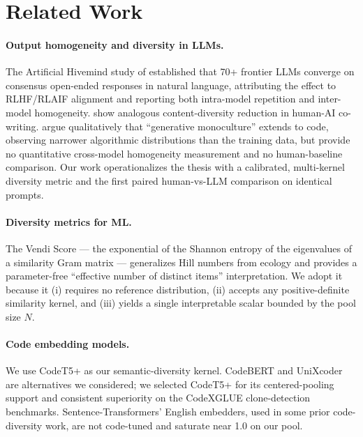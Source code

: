 \documentclass{article}
\begin{document}
\section{Related Work}
\label{sec:related}

\paragraph{Output homogeneity and diversity in LLMs.}
The Artificial Hivemind study of \citet{jiang2025hivemind} established that
70+ frontier LLMs converge on consensus open-ended responses in natural
language, attributing the effect to RLHF/RLAIF alignment and reporting both
intra-model repetition and inter-model homogeneity. \citet{padmakumar2024writing}
show analogous content-diversity reduction in human-AI co-writing.
\citet{wu2024monoculture} argue qualitatively that ``generative monoculture''
extends to code, observing narrower algorithmic distributions than the
training data, but provide no quantitative cross-model homogeneity measurement
and no human-baseline comparison. Our work operationalizes the
\citeauthor{wu2024monoculture} thesis with a calibrated, multi-kernel diversity
metric and the first paired human-vs-LLM comparison on identical prompts.

\paragraph{Diversity metrics for ML.}
The Vendi Score \citep{friedman2023vendi} --- the exponential of the Shannon
entropy of the eigenvalues of a similarity Gram matrix --- generalizes Hill
numbers from ecology and provides a parameter-free ``effective number of
distinct items'' interpretation. We adopt it because it (i) requires no
reference distribution, (ii) accepts any positive-definite similarity kernel,
and (iii) yields a single interpretable scalar bounded by the pool size $N$.

\paragraph{Code embedding models.}
We use CodeT5+ \citep{wang2023codet5p} as our semantic-diversity kernel.
CodeBERT \citep{feng2020codebert} and UniXcoder \citep{guo2022unixcoder} are
alternatives we considered; we selected CodeT5+ for its centered-pooling
support and consistent superiority on the CodeXGLUE clone-detection
benchmarks. Sentence-Transformers' English embedders, used in some prior
code-diversity work, are not code-tuned and saturate near 1.0 on our pool.
\end{document}
